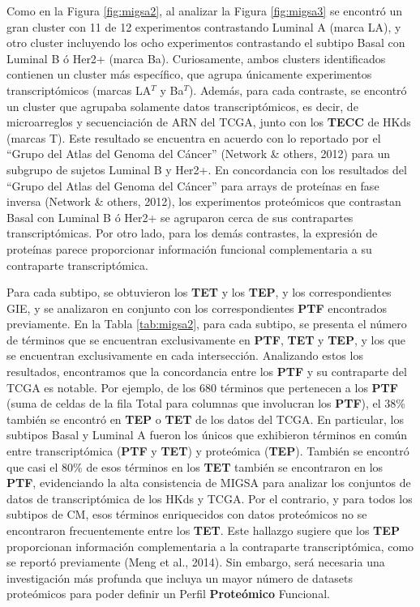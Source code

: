 \documentclass[12pt,twoside]{reedthesis}
\begin{document}
Como en la Figura \ref{fig:migsa2}, al analizar la Figura \ref{fig:migsa3} se encontró un gran cluster con 11 de 12 experimentos contrastando Luminal A (marca LA), y otro cluster incluyendo los ocho experimentos contrastando el subtipo Basal con Luminal B ó Her2+ (marca Ba). Curiosamente, ambos clusters identificados contienen un cluster más específico, que agrupa únicamente experimentos transcriptómicos (marcas LA\(^T\) y Ba\(^T\)). Además, para cada contraste, se encontró un cluster que agrupaba solamente datos transcriptómicos, es decir, de microarreglos y secuenciación de ARN del TCGA, junto con los \textbf{TECC} de HKds (marcas T). Este resultado se encuentra en acuerdo con lo reportado por el ``Grupo del Atlas del Genoma del Cáncer'' (Network \& others, 2012) para un subgrupo de sujetos Luminal B y Her2+. En concordancia con los resultados del ``Grupo del Atlas del Genoma del Cáncer'' para arrays de proteínas en fase inversa (Network \& others, 2012), los experimentos proteómicos que contrastan Basal con Luminal B ó Her2+ se agruparon cerca de sus contrapartes transcriptómicas. Por otro lado, para los demás contrastes, la expresión de proteínas parece proporcionar información funcional complementaria a su contraparte transcriptómica.

\par

Para cada subtipo, se obtuvieron los \textbf{TET} y los \textbf{TEP}, y los correspondientes GIE, y se analizaron en conjunto con los correspondientes \textbf{PTF} encontrados previamente. En la Tabla \ref{tab:migsa2}, para cada subtipo, se presenta el número de términos que se encuentran exclusivamente en \textbf{PTF}, \textbf{TET} y \textbf{TEP}, y los que se encuentran exclusivamente en cada intersección. Analizando estos los resultados, encontramos que la concordancia entre los \textbf{PTF} y su contraparte del TCGA es notable. Por ejemplo, de los 680 términos que pertenecen a los \textbf{PTF} (suma de celdas de la fila Total para columnas que involucran los \textbf{PTF}), el 38\% también se encontró en \textbf{TEP} o \textbf{TET} de los datos del TCGA. En particular, los subtipos Basal y Luminal A fueron los únicos que exhibieron términos en común entre transcriptómica (\textbf{PTF} y \textbf{TET}) y proteómica (\textbf{TEP}). También se encontró que casi el 80\% de esos términos en los \textbf{TET} también se encontraron en los \textbf{PTF}, evidenciando la alta consistencia de MIGSA para analizar los conjuntos de datos de transcriptómica de los HKds y TCGA. Por el contrario, y para todos los subtipos de CM, esos términos enriquecidos con datos proteómicos no se encontraron frecuentemente entre los \textbf{TET}. Este hallazgo sugiere que los \textbf{TEP} proporcionan información complementaria a la contraparte transcriptómica, como se reportó previamente (Meng et al., 2014). Sin embargo, será necesaria una investigación más profunda que incluya un mayor número de datasets proteómicos para poder definir un Perfil \textbf{Proteómico} Funcional.
\end{document}
